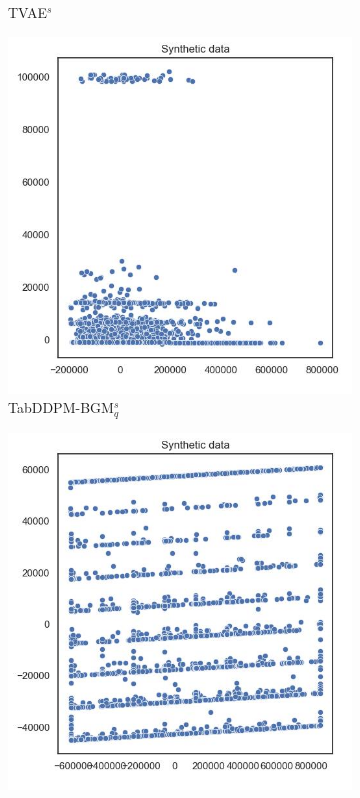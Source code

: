 \begin{figure}[h]
\begin{subfigure}{0.3\textwidth}
        \caption{TVAE$^s$}
    \end{subfigure}
	\begin{subfigure}{0.3\textwidth}
		\includegraphics[width=\textwidth]{images/pca/tab-ddpm-bgm-simTune.jpg}
		\caption{TabDDPM-BGM$^{s}_q$}
	\end{subfigure}
	\begin{subfigure}{0.3\textwidth}
		\includegraphics[width=\textwidth]{images/pca/tab-ddpm-ft-simTune.jpg}

\end{subfigure}
\end{figure}
